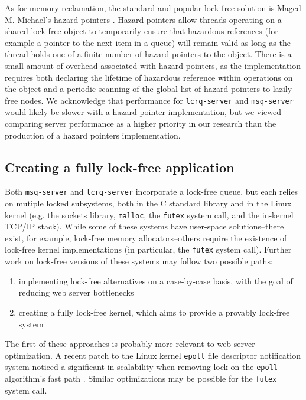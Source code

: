 \documentclass[twoside,10pt]{article}
\begin{document}
\begin{multicols}{2}
As for memory reclamation, the standard and popular lock-free solution
is Maged M. Michael's hazard pointers \cite{michael2004hazard}. Hazard
pointers allow threads operating on a shared lock-free object to
temporarily ensure that hazardous references (for example a pointer to
the next item in a queue) will remain valid as long as the thread
holds one of a finite number of hazard pointers to the object. There
is a small amount of overhead associated with hazard pointers, as the
implementation requires both declaring the lifetime of hazardous
reference within operations on the object and a periodic scanning of
the global list of hazard pointers to lazily free nodes. We
acknowledge that performance for \verb+lcrq-server+ and
\verb+msq-server+ would likely be slower with a hazard pointer
implementation, but we viewed comparing server performance as a higher
priority in our research than the production of a hazard pointers
implementation.

\subsection{Creating a fully lock-free application}

Both \verb+msq-server+ and \verb+lcrq-server+ incorporate a lock-free
queue, but each relies on mutiple locked subsystems, both in the C
standard library and in the Linux kernel (e.g. the sockets library,
\verb+malloc+, the \verb+futex+ system call, and the in-kernel TCP/IP
stack). While some of these systems have user-space solutions\---there
exist, for example, lock-free memory allocators\---others require the
existence of lock-free kernel implementations (in particular, the
\verb+futex+ system call). Further work on lock-free versions of these
systems may follow two possible paths:
\begin{enumerate}
\item implementing lock-free alternatives on a case-by-case basis,
  with the goal of reducing web server bottlenecks 
\item creating a fully lock-free kernel, which aims to provide a
  provably lock-free system
\end{enumerate}

The first of these approaches is probably more relevant to web-server
optimization. A recent patch to the Linux kernel \verb+epoll+ file
descriptor notification system noticed a significant in scalability
when removing lock on the \verb+epoll+ algorithm's fast path
\cite{lockfree-epoll}. Similar optimizations may be possible for the
\verb+futex+ system call.


\end{multicols}
\end{document}
